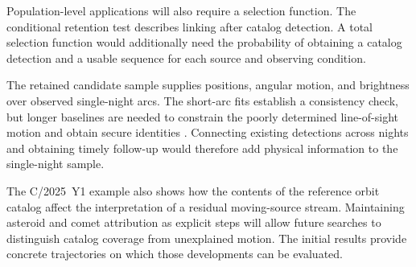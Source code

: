 Population-level applications will
also require a selection function.
The conditional retention test
describes linking after catalog
detection. A total selection function
would additionally need the
probability of obtaining a catalog
detection and a usable sequence
for each source and observing
condition.


The retained candidate sample supplies
positions, angular motion, and brightness
over observed single-night arcs. The
short-arc fits establish a consistency
check, but longer baselines are needed
to constrain the poorly determined
line-of-sight motion and obtain secure
identities \citep{Kubica2007,Holman2018,Moeyens2021}.
Connecting existing detections across
nights and obtaining timely follow-up
would therefore add physical information
to the single-night sample.

The C/2025~Y1 example also shows how the
contents of the reference orbit catalog
affect the interpretation of a residual
moving-source stream. Maintaining
asteroid and comet attribution as
explicit steps will allow future
searches to distinguish catalog coverage
from unexplained motion. The initial
results provide concrete trajectories
on which those developments can be
evaluated.
